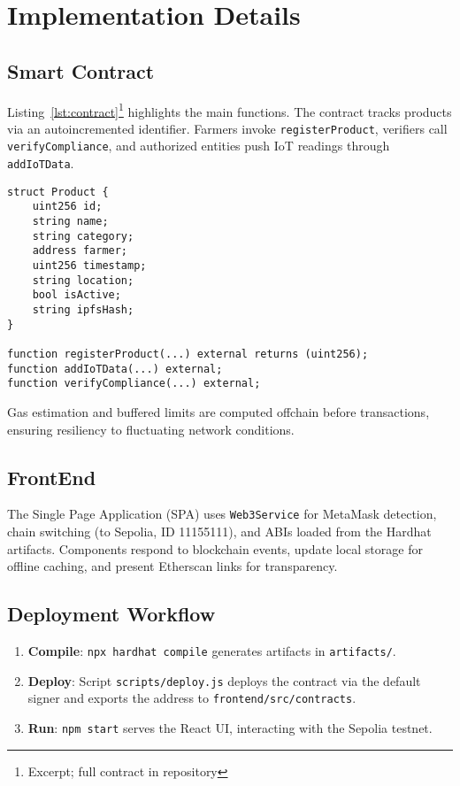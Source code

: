 \documentclass[conference]{IEEEtran}
\begin{document}
\section{Implementation Details}
\subsection{Smart Contract}
Listing~\ref{lst:contract}\footnote{Excerpt; full contract in repository} highlights the main functions. The contract tracks products via an auto\textendash incremented identifier. Farmers invoke \texttt{registerProduct}, verifiers call \texttt{verifyCompliance}, and authorized entities push IoT readings through \texttt{addIoTData}.
\begin{lstlisting}[language=Solidity, caption={Excerpt of \texttt{SupplyChain.sol}}, label={lst:contract}]
struct Product {
    uint256 id;
    string name;
    string category;
    address farmer;
    uint256 timestamp;
    string location;
    bool isActive;
    string ipfsHash;
}

function registerProduct(...) external returns (uint256);
function addIoTData(...) external;
function verifyCompliance(...) external;
\end{lstlisting}
Gas estimation and buffered limits are computed off\textendash chain before transactions, ensuring resiliency to fluctuating network conditions.

\subsection{Front\textendash End}
The Single Page Application (SPA) uses \texttt{Web3Service} for MetaMask detection, chain switching (to Sepolia, ID 11155111), and ABIs loaded from the Hardhat artifacts. Components respond to blockchain events, update local storage for offline caching, and present Etherscan links for transparency.

\subsection{Deployment Workflow}
\begin{enumerate}
    \item \textbf{Compile}: \texttt{npx hardhat compile} generates artifacts in \texttt{artifacts/}.
    \item \textbf{Deploy}: Script \texttt{scripts/deploy.js} deploys the contract via the default signer and exports the address to \texttt{frontend/src/contracts}.
    \item \textbf{Run}: \texttt{npm start} serves the React UI, interacting with the Sepolia testnet.
\end{enumerate}
\end{document}
